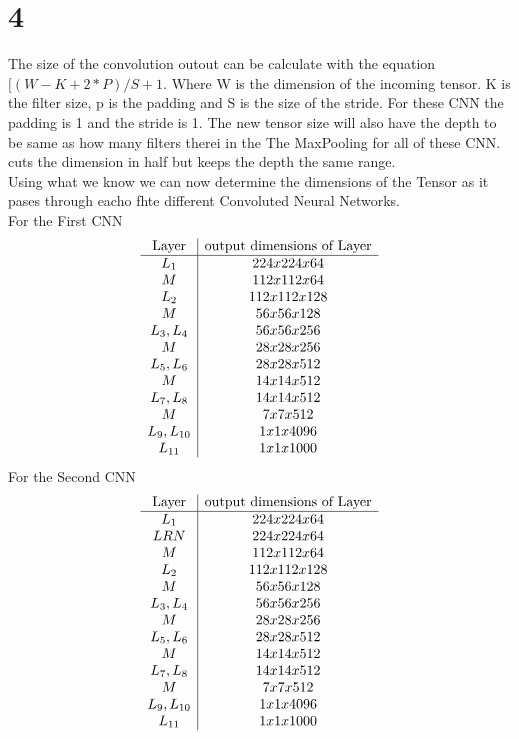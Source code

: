 \documentclass[12pt,english]{article}
\begin{document}
\section*{4}
The size of the convolution outout can be calculate with the equation $[(W - K + 2*P)/S + 1$. Where W is the dimension of the  incoming tensor. K is the filter size, p is the padding and S is the size of the stride. For these CNN the padding is 1 and the stride is 1. The new tensor size will also have the depth to be same as how many filters therei in the  The MaxPooling for all of these CNN. cuts the dimension in half but keeps the depth the same range.\\
Using what we know we can now determine the dimensions of the Tensor as it pases through eacho fhte different Convoluted Neural Networks.\\
For the First CNN
\begin{equation*}
\begin{array}{c|c}
 \hbox{Layer}& \hbox{output dimensions of Layer}  \\
\hline
L_1 & 224x224x64 \\
M & 112x112x64 \\
L_2 & 112x112x128 \\
M & 56x56x128 \\
L_3,L_4 & 56x56x256 \\
M & 28x28x256\\
L_5,L_6 & 28x28x512 \\
M & 14x14x512\\
L_7,L_8 & 14x14x512 \\
M & 7x7x512\\
L_9,L_{10} & 1x1x4096 \\
L_{11} & 1x1x1000 
\end{array} 
\end{equation*}
For the Second CNN
\begin{equation*}
\begin{array}{c|c}
 \hbox{Layer}& \hbox{output dimensions of Layer}  \\
\hline
L_1 & 224x224x64 \\
LRN & 224x224x64 \\
M & 112x112x64 \\
L_2 & 112x112x128 \\
M & 56x56x128 \\
L_3,L_4 & 56x56x256 \\
M & 28x28x256\\
L_5,L_6 & 28x28x512 \\
M & 14x14x512\\
L_7,L_8 & 14x14x512 \\
M & 7x7x512\\
L_9,L_{10} & 1x1x4096 \\
L_{11} & 1x1x1000 
\end{array} 
\end{equation*}
\end{document}
